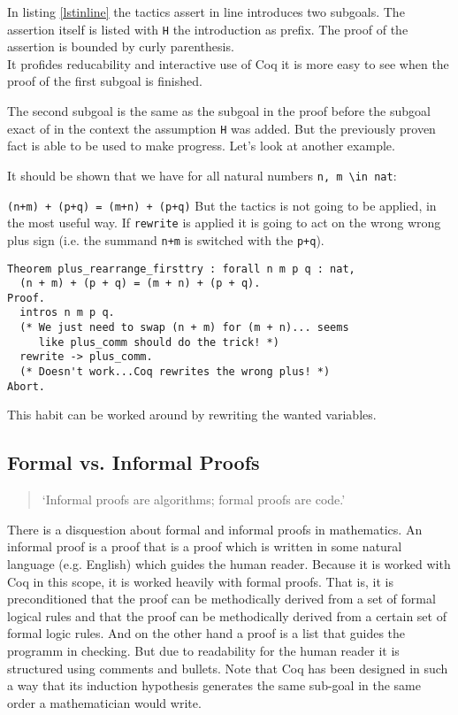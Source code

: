 In listing \ref{lstinline} the tactics assert in line introduces two subgoals. 
The assertion itself is listed with \lstinline!H! the introduction as prefix.
The proof of the assertion is bounded by curly parenthesis.\\
It profides reducability and interactive use of Coq it is more easy to see when the proof of the first subgoal is finished.

The second subgoal is the same as the subgoal in the proof before the subgoal exact of in the context the assumption \lstinline!H! was added.
But the previously proven fact is able to be used to make progress.
Let's look at another example.
 
It should be shown that we have for all natural numbers \lstinline!n, m \in nat!:
 
\lstinline!(n+m) + (p+q) = (m+n) + (p+q)! But the tactics is not going to be applied, in the most useful way. 
If \lstinline!rewrite! is applied it is going to act on the wrong wrong plus sign (i.e. the summand \lstinline!n+m! is switched with the \lstinline!p+q!).
\begin{lstlisting}
Theorem plus_rearrange_firsttry : forall n m p q : nat,
  (n + m) + (p + q) = (m + n) + (p + q).
Proof.
  intros n m p q.
  (* We just need to swap (n + m) for (m + n)... seems
     like plus_comm should do the trick! *)
  rewrite -> plus_comm.
  (* Doesn't work...Coq rewrites the wrong plus! *)
Abort.
\end{lstlisting}

This habit can be worked around by rewriting the wanted variables. 

\subsection{Formal vs. Informal Proofs}

\begin{quote}
`Informal proofs are algorithms; formal proofs are code.'
\end{quote}

There is a disquestion about formal and informal proofs in mathematics. 
An informal proof is a proof that is a proof which is written in some natural language (e.g. English) which guides the human reader.   
Because it is worked with Coq in this scope, it is worked heavily with formal proofs.
That is, it is preconditioned that the proof can be methodically derived from a set of formal logical rules and that the proof can be methodically derived from a certain set of formal logic rules.
And on the other hand a proof is a list that guides the programm in checking. But due to readability for the human reader it is structured using comments and bullets.
Note that Coq has been designed in such a way that its induction hypothesis generates the same sub-goal in the same order a mathematician would write.                                                                                            









